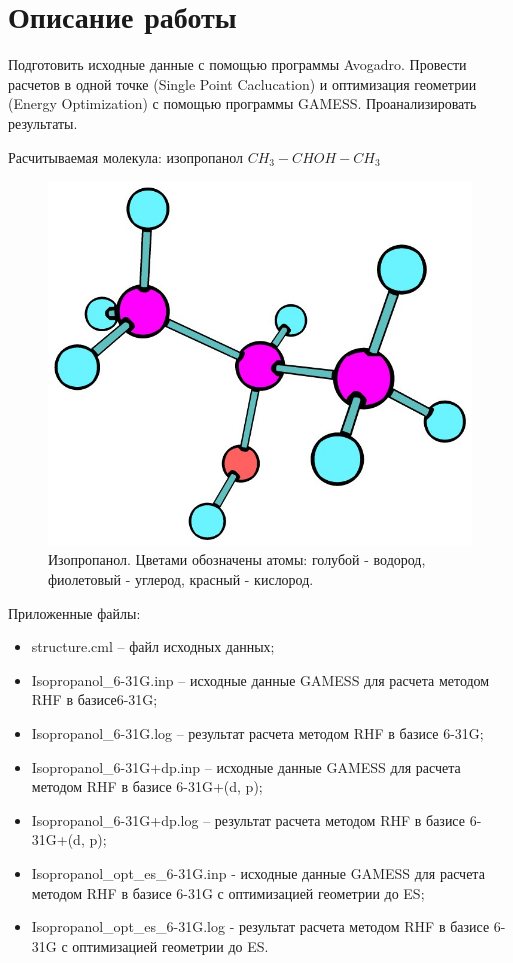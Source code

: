 \section{Описание работы}
Подготовить исходные данные с помощью программы Avogadro. Провести расчетов в одной точке (Single Point Caclucation) и оптимизация геометрии (Energy Optimization) с помощью программы GAMESS. Проанализировать результаты.

Расчитываемая молекула: изопропанол $CH_3 - CHOH - CH_3$
\begin{figure}[H]
\centering
\captionsetup{justification=centering}
\includegraphics[scale=0.4]{fig/0.jpg}
\caption{Изопропанол. Цветами обозначены атомы: голубой - водород, фиолетовый - углерод, красный - кислород.}
\end{figure}

Приложенные файлы:
\begin{itemize}
    \item structure.cml – файл исходных данных;
    \item Isopropanol\_6-31G.inp – исходные данные GAMESS для расчета методом RHF в базисе6-31G;
    \item Isopropanol\_6-31G.log – результат расчета методом RHF в базисе 6-31G;
    \item Isopropanol\_6-31G+dp.inp – исходные данные GAMESS для расчета методом RHF в базисе 6-31G+(d, p);
    \item Isopropanol\_6-31G+dp.log – результат расчета методом RHF в базисе 6-31G+(d, p);
    \item Isopropanol\_opt\_es\_6-31G.inp - исходные данные GAMESS для расчета методом RHF в базисе 6-31G с оптимизацией геометрии до ES;
    \item Isopropanol\_opt\_es\_6-31G.log - результат расчета методом RHF в базисе 6-31G с оптимизацией геометрии до ES.
\end{itemize}{}


